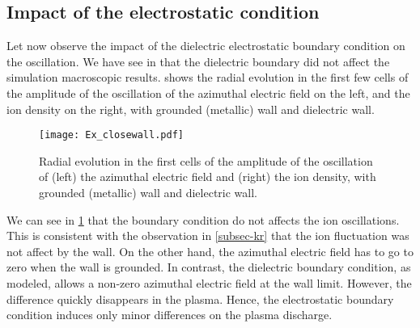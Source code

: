   
  \subsection{Impact of the electrostatic condition}
  \label{subsec-BC}
  
  Let now observe the impact of the dielectric electrostatic boundary condition on the oscillation.
  We have see in  that the dielectric boundary did not affect the simulation macroscopic results.
   shows the radial evolution in the first few cells of the amplitude of the oscillation of the azimuthal electric field on the left, and the ion density on the right, with grounded (metallic) wall and dielectric wall.
  
  \begin{figure}[hbtp]
    \centering
    \texttt{[image: Ex\_closewall.pdf]}
    \caption{Radial evolution in the first cells of the amplitude of the oscillation of (left) the azimuthal electric field and (right) the ion density, with grounded (metallic) wall and dielectric wall.}
    \label{fig-closswallosci}
  \end{figure}
  
  We can see in \cref{fig-closswallosci} that the boundary condition do not affects the ion oscillations.
  This is consistent with the observation in \cref{subsec-kr} that the ion fluctuation was not affect by the wall.
  On the other hand, the azimuthal electric field has to go to zero when the wall is grounded.
  In contrast, the dielectric boundary condition, as modeled, allows a non-zero azimuthal electric field at the wall limit.
  However, the difference quickly disappears in the plasma.
  Hence, the electrostatic boundary condition induces only minor differences on the plasma discharge.
  
  